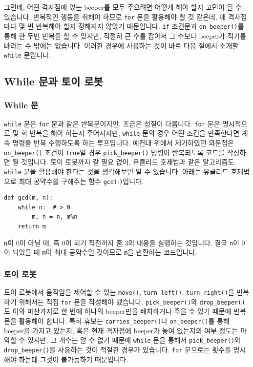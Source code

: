 \documentclass[../main.tex]{subfiles}
\begin{document}
그런데, 어떤 격자점에 있는 beeper를 모두 주으려면 어떻게 해야 할지 고민이 될 수 있습니다.
반복적인 행동을 취해야 하므로 \texttt{for} 문을 활용해야 할 것 같은데, 매 격자점마다 몇 번 반복해야 할지 정해지지 않았기 때문입니다.
\texttt{if} 조건문과 \texttt{on\_beeper()}를 통해 한 두번 반복을 할 수 있지만, 적절히 큰 수를 잡아서 그 수보다 beeper가 적기를 바라는 수 밖에는 없습니다.
이러한 경우에 사용하는 것이 바로 다음 절에서 소개할 \texttt{while} 문입니다.

\subsection{While 문과 토이 로봇}
\subsubsection{While 문}
\texttt{while} 문은 \texttt{for} 문과 같은 반복문이지만, 조금은 성질이 다릅니다.
\texttt{for} 문은 명시적으로 몇 회 반복을 해야 하는지 주어지지만, \texttt{while} 문의 경우 어떤 조건을 만족한다면 계속 명령을 반복 수행하도록 하는 루프입니다.
예컨대 위에서 제기하였던 의문점은 \texttt{on\_beeper()} 조건이 \texttt{True}일 경우 \texttt{pick\_beeper()} 명령이 반복되도록 코드를 작성하면 될 것입니다.
토이 로봇까지 갈 필요 없이, 유클리드 호제법과 같은 알고리즘도 \texttt{while} 문을 활용해야 한다는 것을 생각해보면 알 수 있습니다.
아래는 유클리드 호제법으로 최대 공약수를 구해주는 함수 \texttt{gcd($\cdot$)}입니다.
\begin{verbatim}
def gcd(m, n):
	while n:  # > 0
		m, n = n, m%n
	return m
\end{verbatim}
\texttt{n}이 0이 아닐 때, 즉 0이 되기 직전까지 줄 3의 내용을 실행하는 것입니다.
결국 \texttt{n}이 0이 되었을 때 \texttt{m}이 최대 공약수일 것이므로 \texttt{m}을 반환하는 코드입니다.

\subsubsection{토이 로봇}
토이 로봇에서 움직임을 제어할 수 있는 \texttt{move()}, \texttt{turn\_left()}, \texttt{turn\_right()}을 반복하기 위해서는 직접 \texttt{for} 문을 작성해야 했습니다.
\texttt{pick\_beeper()}와 \texttt{drop\_beeper()}도 이와 마찬가지로 한 번에 하나의 beeper만을 배치하거나 주을 수 있기 때문에 반복문을 활용해야 합니다.
특히 휴보는 \texttt{carries\_beeper()}나 \texttt{on\_beeper()}를 통해 beeper를 가지고 있는지, 혹은 현재 격자점에 beeper가 놓여 있는지의 여부 정도는 파악할 수 있지만, 그 개수는 알 수 없기 때문에 \texttt{while} 문을 통해서 \texttt{pick\_beeper()}와 \texttt{drop\_beeper()}를 사용하는 것이 적절한 경우가 있습니다.
\texttt{for} 문으로는 횟수를 명시해야 하는데 그것이 불가능하기 때문입니다.
\end{document}

